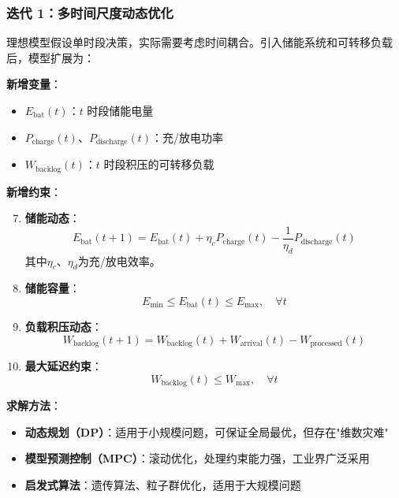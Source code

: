 \documentclass[12pt,a4paper]{article}
\begin{document}
\subsubsection{迭代 1：多时间尺度动态优化}

理想模型假设单时段决策，实际需要考虑时间耦合。引入储能系统和可转移负载后，模型扩展为：

\textbf{新增变量}：
\begin{itemize}
    \item $E_{\text{bat}}(t)$：$t$ 时段储能电量
    \item $P_{\text{charge}}(t)$、$P_{\text{discharge}}(t)$：充/放电功率
    \item $W_{\text{backlog}}(t)$：$t$ 时段积压的可转移负载
\end{itemize}

\textbf{新增约束}：
\begin{enumerate}
    \setcounter{enumi}{6}
    \item \textbf{储能动态}：
    \begin{equation}
    E_{\text{bat}}(t+1) = E_{\text{bat}}(t) + \eta_c P_{\text{charge}}(t) - \frac{1}{\eta_d} P_{\text{discharge}}(t)
    \label{eq:battery-dynamics}
    \end{equation}
    其中$\eta_c$、$\eta_d$为充/放电效率。
    
    \item \textbf{储能容量}：
    \begin{equation}
    E_{\min} \leq E_{\text{bat}}(t) \leq E_{\max}, \quad \forall t
    \label{eq:battery-capacity}
    \end{equation}
    
    \item \textbf{负载积压动态}：
    \begin{equation}
    W_{\text{backlog}}(t+1) = W_{\text{backlog}}(t) + W_{\text{arrival}}(t) - W_{\text{processed}}(t)
    \label{eq:workload-dynamics}
    \end{equation}
    
    \item \textbf{最大延迟约束}：
    \begin{equation}
    W_{\text{backlog}}(t) \leq W_{\max}, \quad \forall t
    \label{eq:max-delay}
    \end{equation}
\end{enumerate}

\textbf{求解方法}：
\begin{itemize}
    \item \textbf{动态规划（DP）}：适用于小规模问题，可保证全局最优，但存在"维数灾难"
    \item \textbf{模型预测控制（MPC）}：滚动优化，处理约束能力强，工业界广泛采用
    \item \textbf{启发式算法}：遗传算法、粒子群优化，适用于大规模问题
\end{itemize}
\end{document}

